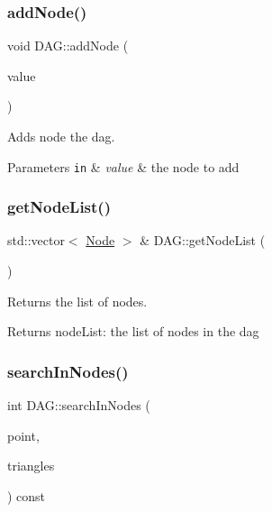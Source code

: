 \subsubsection{\texorpdfstring{add\+Node()}{addNode()}\hspace{0.1cm}{\footnotesize\ttfamily [3/3]}}
{\footnotesize\ttfamily void D\+A\+G\+::add\+Node (\begin{DoxyParamCaption}\item[{const \hyperlink{classNode}{Node} \&}]{value }\end{DoxyParamCaption})}



Adds node the dag. 


\begin{DoxyParams}[1]{Parameters}
\mbox{\tt in}  & {\em value} & the node to add \\
\hline
\end{DoxyParams}
\mbox{\label{classDAG_af8afaefe800c1eb05ef631e148692c2d}} 
\subsubsection{\texorpdfstring{get\+Node\+List()}{getNodeList()}}
{\footnotesize\ttfamily std\+::vector$<$ \hyperlink{classNode}{Node} $>$ \& D\+A\+G\+::get\+Node\+List (\begin{DoxyParamCaption}{ }\end{DoxyParamCaption})}



Returns the list of nodes. 

\begin{DoxyReturn}{Returns}
node\+List\+: the list of nodes in the dag 
\end{DoxyReturn}
\mbox{\label{classDAG_addd2c3b6de47c3873bb6c0bd074f2a67}} 
\subsubsection{\texorpdfstring{search\+In\+Nodes()}{searchInNodes()}}
{\footnotesize\ttfamily int D\+A\+G\+::search\+In\+Nodes (\begin{DoxyParamCaption}\item[{const cg3\+::\+Point2\+Dd \&}]{point,  }\item[{const std\+::vector$<$ \hyperlink{classTriangle}{Triangle} $>$ \&}]{triangles }\end{DoxyParamCaption}) const}



